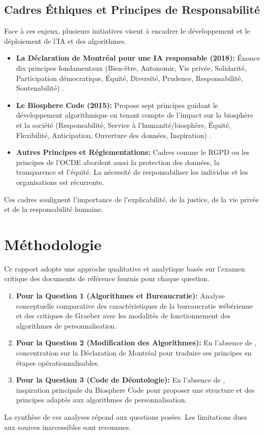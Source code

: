 \documentclass[11pt,a4paper]{article}
\begin{document}
\subsection{Cadres Éthiques et Principes de Responsabilité}
Face à ces enjeux, plusieurs initiatives visent à encadrer le développement et le déploiement de l'IA et des algorithmes.
\begin{itemize}
    \item \textbf{La Déclaration de Montréal pour une IA responsable (2018):} Énonce dix principes fondamentaux (Bien-être, Autonomie, Vie privée, Solidarité, Participation démocratique, Équité, Diversité, Prudence, Responsabilité, Soutenabilité) \cite{DeclarationMontreal2018}.
    \item \textbf{Le Biosphere Code (2015):} Propose sept principes guidant le développement algorithmique en tenant compte de l'impact sur la biosphère et la société (Responsabilité, Service à l'humanité/biosphère, Équité, Flexibilité, Anticipation, Ouverture des données, Inspiration) \cite{BiosphereCode2015}.
    \item \textbf{Autres Principes et Réglementations:} Cadres comme le RGPD ou les principes de l'OCDE abordent aussi la protection des données, la transparence et l'équité. La nécessité de responsabiliser les individus et les organisations est récurrente.
\end{itemize}
Ces cadres soulignent l'importance de l'explicabilité, de la justice, de la vie privée et de la responsabilité humaine.

\section{Méthodologie}
Ce rapport adopte une approche qualitative et analytique basée sur l'examen critique des documents de référence fournis pour chaque question.

\begin{enumerate}
    \item \textbf{Pour la Question 1 (Algorithmes et Bureaucratie):} Analyse conceptuelle comparative des caractéristiques de la bureaucratie wébérienne \cite{SerpaFerreira2019} et des critiques de Graeber \cite{Graeber2015} avec les modalités de fonctionnement des algorithmes de personnalisation.
    \item \textbf{Pour la Question 2 (Modification des Algorithmes):} En l'absence de \cite{PraxisInaccessible}, concentration sur la Déclaration de Montréal \cite{DeclarationMontreal2018} pour traduire ses principes en étapes opérationnalisables.
    \item \textbf{Pour la Question 3 (Code de Déontologie):} En l'absence de \cite{Neuer2018Inaccessible}, inspiration principale du Biosphere Code \cite{BiosphereCode2015} pour proposer une structure et des principes adaptés aux algorithmes de personnalisation.
\end{enumerate}
La synthèse de ces analyses répond aux questions posées. Les limitations dues aux sources inaccessibles sont reconnues.
\end{document}
